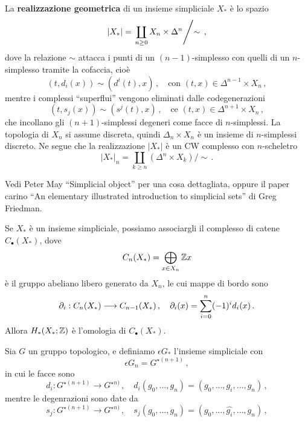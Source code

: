 \begin{df}
	La \textbf{realizzazione geometrica} di un insieme simpliciale $X_{*}$
	è lo spazio
	\begin{equation*}
		|X_{*}| = \left. \coprod_{n \ge 0} X_{n} \times \Delta^{n} \middle/ \sim \right. \,,
	\end{equation*}
	dove la relazione $\sim$ attacca i punti di un $(n-1)$-simplesso con
    quelli di un $n$-simplesso tramite la cofaccia, cioè
    \begin{equation*}
    	(t, d_{i}(x)) \sim (d^{i}(t),x)\,, \quad \text{con } (t,x) \in \Delta^{n-1} \times X_{n}\,,
    \end{equation*}
    mentre i complessi ``superflui'' vengono eliminati dalle codegenerazioni
    \begin{equation*}
    	(t, s_{j}(x)) \sim (s^{j}(t),x)\,, \quad \text{ce } (t,x) \in \Delta^{n+1} \times X_{n}\,,
    \end{equation*}
    che incollano gli $(n+1)$-simplessi degeneri come facce di $n$-simplessi.
    La topologia di $X_{n}$ si assume discreta,
    quindi $\Delta_{n} \times X_{n}$ è un insieme di $n$-simplessi discreto.
    Ne segue che la realizzazione $|X_{*}|$ è un CW complesso con $n$-scheletro
    \begin{equation*}
    	|X_{*}|_{n} = \coprod_{k \ge n} (\Delta^{n} \times X_{k})/\sim\,.
    \end{equation*}
\end{df}

Vedi Peter May ``Simplicial object'' per una cosa dettagliata,
oppure il paper carino ``An elementary illustrated introduction to simplicial sets'' di Greg Friedman.

\begin{prop}
	Se $X_{*}$ è un insieme simpliciale,
	possiamo associargli il complesso di catene
	$C_{\bullet}(X_{*})$, dove
	\begin{equation*}
		C_{n}(X_{*}) = \bigoplus_{x \in X_{n}} {\mathbb Z} x
	\end{equation*}
	è il gruppo abeliano libero generato da $X_{n}$,
	le cui mappe di bordo sono
	\begin{equation*}
		\partial_{i}: C_{n}(X_{*}) \longrightarrow C_{n-1}(X_{*})\,,
		\quad \partial_{i}(x) = \sum_{i=0}^{n}(-1)^{i}d_{i}(x)\,.
	\end{equation*}
	Allora $H_{*}(X_{*};{\mathbb Z})$ è l'omologia di $C_{\bullet}(X_{*})$.
\end{prop}

Sia $G$ un gruppo topologico, e definiamo $\epsilon G_{*}$
l'insieme simpliciale con
\begin{equation*}
	\epsilon G_{n} = G^{\star(n+1)}\,,
\end{equation*}
in cui le facce sono
\begin{equation*}
	d_{i}: G^{\star(n+1)} \longrightarrow G^{\star n)}\,,
	\quad d_{i}(g_{0}, \dots, g_{n}) = (g_{0}, \dots, \widehat{g_{i}}, \dots, g_{n})\,,
\end{equation*}
mentre le degenrazioni sono date da
\begin{equation*}
	s_{j}: G^{\star(n+1)} \longrightarrow G^{\star n)}\,,
	\quad s_{j}(g_{0}, \dots, g_{n}) = (g_{0}, \dots, \widehat{g_{i}}, \dots, g_{n})\,,
\end{equation*}

